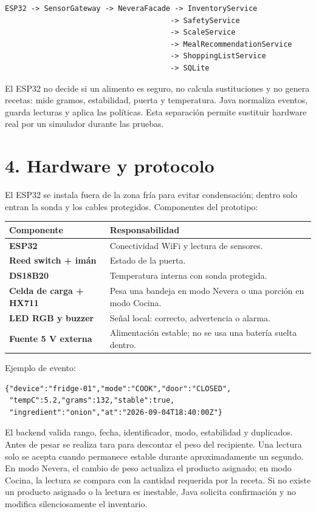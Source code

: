 \documentclass[11pt,a4paper]{article}
\newcommand{\titulo}[1]{\section*{#1}\addcontentsline{toc}{section}{#1}}
\begin{document}
\begin{verbatim}
ESP32 -> SensorGateway -> NeveraFacade -> InventoryService
                                      -> SafetyService
                                      -> ScaleService
                                      -> MealRecommendationService
                                      -> ShoppingListService
                                      -> SQLite
\end{verbatim}

El ESP32 no decide si un alimento es seguro, no calcula sustituciones y no genera recetas: mide gramos, estabilidad, puerta y temperatura. Java normaliza eventos, guarda lecturas y aplica las políticas. Esta separación permite sustituir hardware real por un simulador durante las pruebas.

\titulo{4. Hardware y protocolo}
El ESP32 se instala fuera de la zona fría para evitar condensación; dentro solo entran la sonda y los cables protegidos. Componentes del prototipo:
\begin{center}
\begin{tabularx}{\textwidth}{>{\bfseries}p{3.3cm} X}
\toprule
Componente & Responsabilidad\\
\midrule
ESP32 & Conectividad WiFi y lectura de sensores.\\
Reed switch + imán & Estado de la puerta.\\
DS18B20 & Temperatura interna con sonda protegida.\\
Celda de carga + HX711 & Pesa una bandeja en modo Nevera o una porción en modo Cocina.\\
LED RGB y buzzer & Señal local: correcto, advertencia o alarma.\\
Fuente 5 V externa & Alimentación estable; no se usa una batería suelta dentro.\\
\bottomrule
\end{tabularx}
\end{center}

Ejemplo de evento:
\begin{verbatim}
{"device":"fridge-01","mode":"COOK","door":"CLOSED",
 "tempC":5.2,"grams":132,"stable":true,
 "ingredient":"onion","at":"2026-09-04T18:40:00Z"}
\end{verbatim}

El backend valida rango, fecha, identificador, modo, estabilidad y duplicados. Antes de pesar se realiza tara para descontar el peso del recipiente. Una lectura solo se acepta cuando permanece estable durante aproximadamente un segundo. En modo Nevera, el cambio de peso actualiza el producto asignado; en modo Cocina, la lectura se compara con la cantidad requerida por la receta. Si no existe un producto asignado o la lectura es inestable, Java solicita confirmación y no modifica silenciosamente el inventario.
\end{document}
